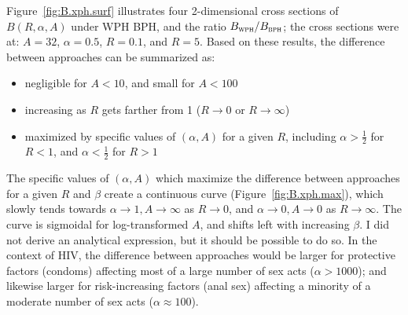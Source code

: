 Figure~\ref{fig:B.xph.surf} illustrates four 2-dimensional cross sections of $B(R,\alpha,A)$
under WPH \vs BPH, and the ratio $B_{\textsc{wph}} / B_{\textsc{bph}}$;
the cross sections were at: $A = 32$, $\alpha = 0.5$, $R = 0.1$, and $R = 5$.
Based on these results, the difference between approaches can be summarized as:
\begin{itemize}
  \item negligible for $A < 10$, and small for $A < 100$
  \item increasing as $R$ gets farther from 1 ($R \rightarrow 0$ or $R \rightarrow \infty$)
  \item maximized by specific values of $(\alpha,A)$ for a given $R$, including
    $\alpha > \frac12$ for $R < 1$, and $\alpha < \frac12$ for $R > 1$
\end{itemize}
The specific values of $(\alpha,A)$ which maximize
the difference between approaches for a given $R$ and $\beta$
create a continuous curve (Figure~\ref{fig:B.xph.max}), which slowly tends towards
$\alpha \rightarrow 1, A \rightarrow \infty$ as $R \rightarrow 0$, and
$\alpha \rightarrow 0, A \rightarrow 0$ as $R \rightarrow \infty$.
The curve is sigmoidal for log-transformed $A$,
and shifts left with increasing $\beta$.
I did not derive an analytical expression, but it should be possible to do so.
In the context of HIV, the difference between approaches would be
larger for protective factors (\eg condoms)
affecting most of a large number of sex acts ($\alpha > 1000$);
and likewise larger for risk-increasing factors (\eg anal sex)
affecting a minority of a moderate number of sex acts ($\alpha \approx 100$).
